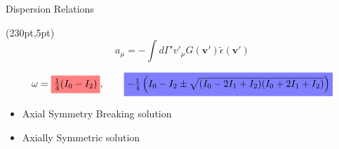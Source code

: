 \begin{frame}{Dispersion Relations}

   \begin{textblock*}{100pt}(230pt,5pt)
      \begin{equation*}
           a_\mu = -\int d\Gamma' v'_{\mu} G(\boldsymbol{v}') \tilde \epsilon (\boldsymbol{v}')
      \end{equation*}
   \end{textblock*}

   \begin{equation*}
       \omega =
               {\colorbox{red!50}{$\frac{1}{4}(I_0-I_2)$}}
               , \qquad
               \colorbox{blue!50}{$-\frac{1}{4}\left(I_0-I_2\pm \sqrt{ (I_0-2I_1+I_2)(I_0+2I_1+I_2) }\right)$}
   \end{equation*}




   \begin{itemize}
       \item \colorbox{red!50}{Axial Symmetry Breaking solution}
       \item \colorbox{blue!50}{Axially Symmetric solution}
   \end{itemize}





















\end{frame}

